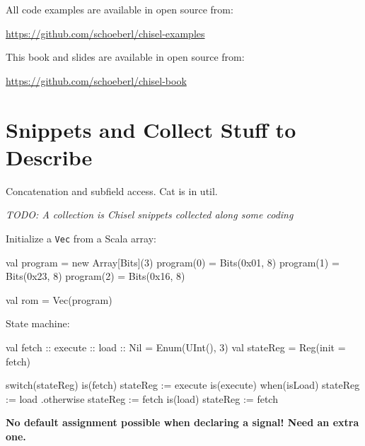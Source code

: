 \documentclass[%
    11pt, %
    headinclude, footexclude,
    openright, %
    notitlepage,
    cleardoubleempty,
    headsepline,
    pointlessnumbers,
    bibtotoc, idxtotoc,
    ]{scrbook}
\newcommand{\code}[1]{{\small{\texttt{#1}}}}
\newcommand{\todo}[1]{{\emph{TODO: #1}}}
\begin{document}
All code examples are available in open source from:

\url{https://github.com/schoeberl/chisel-examples}

This book and slides are available in open source from:

\url{https://github.com/schoeberl/chisel-book}




\chapter*{Snippets and Collect Stuff to Describe}

Concatenation and subfield access. Cat is in util. 

\todo{A collection is Chisel snippets collected along some coding}

Initialize a \code{Vec} from a Scala array:
\begin{chisel}
  val program = new Array[Bits](3)
  program(0) = Bits(0x01, 8)
  program(1) = Bits(0x23, 8)
  program(2) = Bits(0x16, 8)
    
  val rom = Vec(program)
\end{chisel}

State machine:
\begin{chisel}
  val fetch :: execute :: load :: Nil = Enum(UInt(), 3)
  val stateReg = Reg(init = fetch)

  switch(stateReg) {
    is(fetch) {
      stateReg := execute
    }
    is(execute) {
      when(isLoad) {
        stateReg := load
      }.otherwise {
        stateReg := fetch
      }
    }
    is(load) {
      stateReg := fetch
    }
  }
\end{chisel}

\textbf{No default assignment possible when declaring a signal! Need an extra one.}
\end{document}

